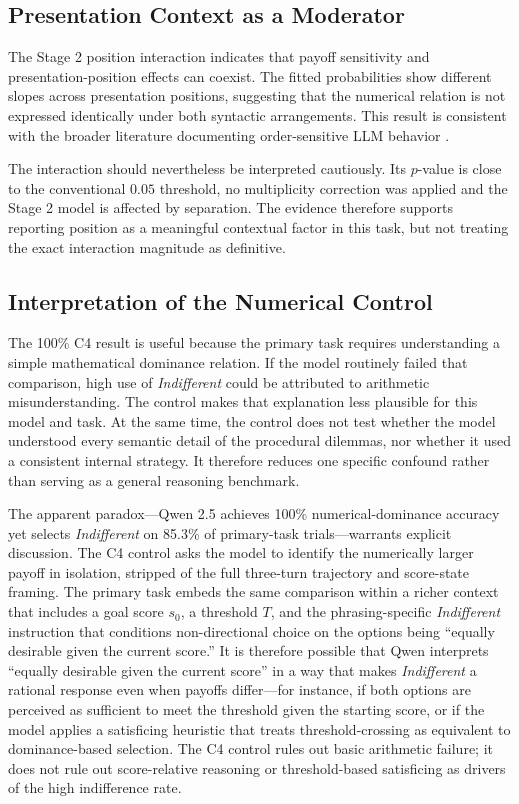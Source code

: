 \documentclass[10pt,journal,compsoc]{IEEEtran}
\begin{document}
\subsection{Presentation Context as a Moderator}
The Stage 2 position interaction indicates that payoff sensitivity and presentation-position effects can coexist. The fitted probabilities show different slopes across presentation positions, suggesting that the numerical relation is not expressed identically under both syntactic arrangements. This result is consistent with the broader literature documenting order-sensitive LLM behavior \cite{fragile_preferences_2026}.

The interaction should nevertheless be interpreted cautiously. Its $p$-value is close to the conventional $0.05$ threshold, no multiplicity correction was applied and the Stage 2 model is affected by separation. The evidence therefore supports reporting position as a meaningful contextual factor in this task, but not treating the exact interaction magnitude as definitive.

\subsection{Interpretation of the Numerical Control}
The 100\% C4 result is useful because the primary task requires understanding a simple mathematical dominance relation. If the model routinely failed that comparison, high use of \textit{Indifferent} could be attributed to arithmetic misunderstanding. The control makes that explanation less plausible for this model and task. At the same time, the control does not test whether the model understood every semantic detail of the procedural dilemmas, nor whether it used a consistent internal strategy. It therefore reduces one specific confound rather than serving as a general reasoning benchmark.

The apparent paradox---Qwen 2.5 achieves 100\% numerical-dominance accuracy yet selects \textit{Indifferent} on 85.3\% of primary-task trials---warrants explicit discussion. The C4 control asks the model to identify the numerically larger payoff in isolation, stripped of the full three-turn trajectory and score-state framing. The primary task embeds the same comparison within a richer context that includes a goal score $s_0$, a threshold $T$, and the phrasing-specific \textit{Indifferent} instruction that conditions non-directional choice on the options being ``equally desirable given the current score.'' It is therefore possible that Qwen interprets ``equally desirable given the current score'' in a way that makes \textit{Indifferent} a rational response even when payoffs differ---for instance, if both options are perceived as sufficient to meet the threshold given the starting score, or if the model applies a satisficing heuristic that treats threshold-crossing as equivalent to dominance-based selection. The C4 control rules out basic arithmetic failure; it does not rule out score-relative reasoning or threshold-based satisficing as drivers of the high indifference rate.
\end{document}
